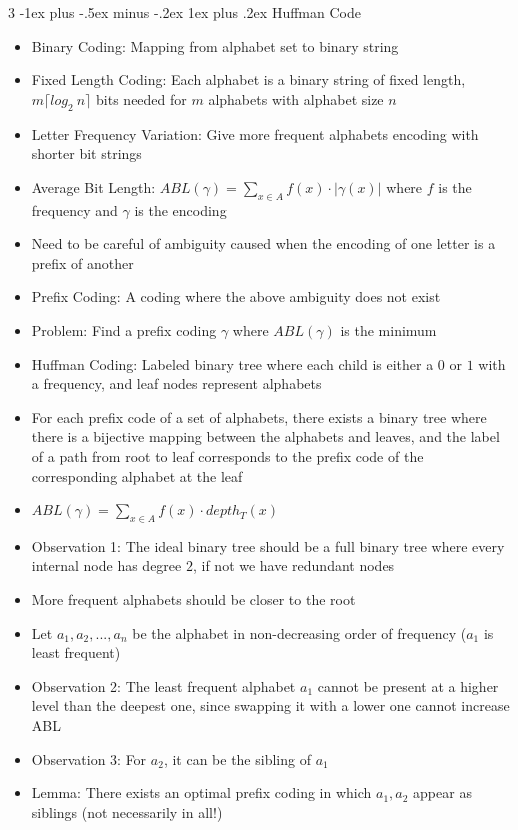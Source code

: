 \documentclass[10pt, landscape]{article}
\makeatletter
\renewcommand{\subsection}{\@startsection{subsection}{3}{0mm}%
                                {-1ex plus -.5ex minus -.2ex}%
                                {1ex plus .2ex}%
                                {\normalfont\small\bfseries}}%
\makeatother
\begin{document}
\begin{multicols*}{3}
\subsection{Huffman Code}
\begin{itemize}
    \item Binary Coding: Mapping from alphabet set to binary string
    \item Fixed Length Coding: Each alphabet is a binary string of fixed length, $m\lceil log_2\ n \rceil$ bits needed for $m$ alphabets with alphabet size $n$
    \item Letter Frequency Variation: Give more frequent alphabets encoding with shorter bit strings
    \item Average Bit Length: $ABL(\gamma)=\sum_{x\in A}f(x)\cdot|\gamma(x)|$ where $f$ is the frequency and $\gamma$ is the encoding
    \item Need to be careful of ambiguity caused when the encoding of one letter is a prefix of another
    \item Prefix Coding: A coding where the above ambiguity does not exist
    \item Problem: Find a prefix coding $\gamma$ where $ABL(\gamma)$ is the minimum
    \item Huffman Coding: Labeled binary tree where each child is either a $0$ or $1$ with a frequency, and leaf nodes represent alphabets
    \item For each prefix code of a set of alphabets, there exists a binary tree where there is a bijective mapping between the alphabets and leaves, and the label of a path from root to leaf corresponds to the prefix code of the corresponding alphabet at the leaf
    \item $ABL(\gamma)=\sum_{x\in A}f(x)\cdot depth_T(x)$
    \item Observation 1: The ideal binary tree should be a full binary tree where every internal node has degree $2$, if not we have redundant nodes
    \item More frequent alphabets should be closer to the root
    \item Let $a_1,a_2,...,a_n$ be the alphabet in non-decreasing order of frequency ($a_1$ is least frequent)
    \item Observation 2: The least frequent alphabet $a_1$ cannot be present at a higher level than the deepest one, since swapping it with a lower one cannot increase ABL
    \item Observation 3: For $a_2$, it can be the sibling of $a_1$
    \item Lemma: There exists an optimal prefix coding in which $a_1,a_2$ appear as siblings (not necessarily in all!)

\end{itemize}
\end{multicols*}
\end{document}
